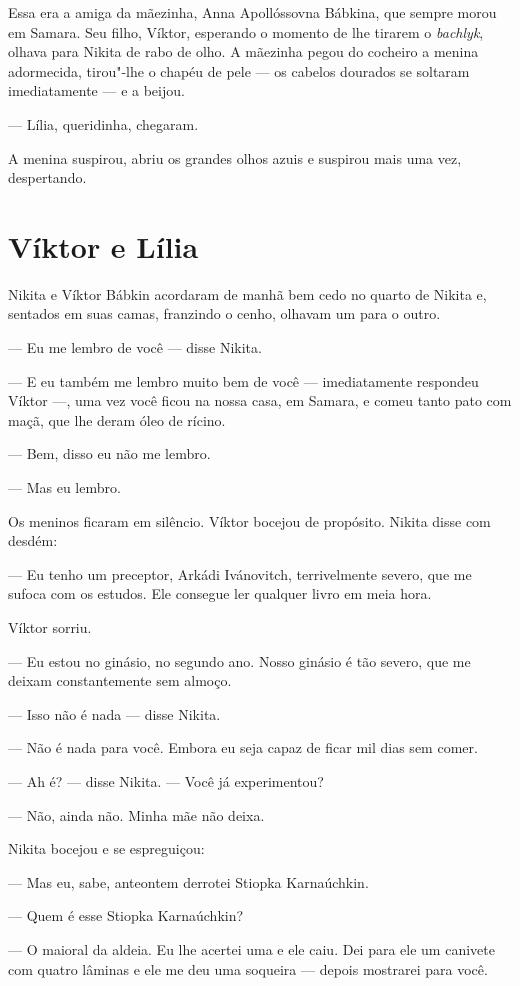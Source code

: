 Essa era a amiga da mãezinha, Anna Apollóssovna Bábkina, que sempre
morou em Samara. Seu filho, Víktor, esperando o momento de lhe tirarem o
\emph{bachlyk}, olhava para Nikita de rabo de olho. A mãezinha pegou do
cocheiro a menina adormecida, tirou"-lhe o chapéu de pele --- os cabelos
dourados se soltaram imediatamente --- e a beijou.

--- Lília, queridinha, chegaram.

A menina suspirou, abriu os grandes olhos azuis e suspirou mais uma vez,
despertando.

\chapter{Víktor e Lília}

Nikita e Víktor Bábkin acordaram de manhã bem cedo no quarto de Nikita
e, sentados em suas camas, franzindo o cenho, olhavam um para o outro.

--- Eu me lembro de você --- disse Nikita.

--- E eu também me lembro muito bem de você --- imediatamente respondeu
Víktor ---, uma vez você ficou na nossa casa, em Samara, e comeu tanto
pato com maçã, que lhe deram óleo de rícino.

--- Bem, disso eu não me lembro.

--- Mas eu lembro.

Os meninos ficaram em silêncio. Víktor bocejou de propósito. Nikita
disse com desdém:

--- Eu tenho um preceptor, Arkádi Ivánovitch, terrivelmente severo, que
me sufoca com os estudos. Ele consegue ler qualquer livro em meia hora.

Víktor sorriu.

--- Eu estou no ginásio, no segundo ano. Nosso ginásio é tão severo, que
me deixam constantemente sem almoço.

--- Isso não é nada --- disse Nikita.

--- Não é nada para você. Embora eu seja capaz de ficar mil dias sem
comer.

--- Ah é? --- disse Nikita. --- Você já experimentou?

--- Não, ainda não. Minha mãe não deixa.

Nikita bocejou e se espreguiçou:

--- Mas eu, sabe, anteontem derrotei Stiopka Karnaúchkin.

--- Quem é esse Stiopka Karnaúchkin?

--- O maioral da aldeia. Eu lhe acertei uma e ele caiu. Dei para ele um
canivete com quatro lâminas e ele me deu uma soqueira --- depois
mostrarei para você.

